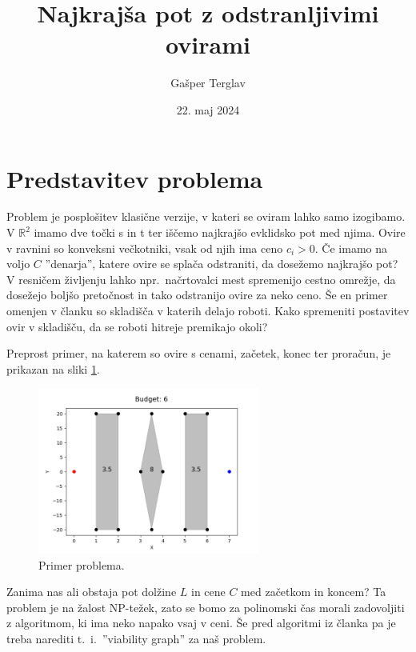 \documentclass{article}
\author{Gašper Terglav}
\date{22. maj 2024}
\title{Najkrajša pot z odstranljivimi ovirami}
\begin{document}
\maketitle


\section*{Predstavitev problema}

Problem je posplošitev klasične verzije, v kateri se oviram lahko samo izogibamo. V $\mathbb{R}^2$ imamo dve točki s in t ter iščemo najkrajšo evklidsko pot med njima. Ovire v ravnini so konveksni večkotniki, vsak od njih ima ceno $c_i > 0$. Če imamo na voljo $C$ ''denarja'', katere ovire se splača odstraniti, da dosežemo najkrajšo pot? V resničem življenju lahko npr.\ načrtovalci mest spremenijo cestno omrežje, da dosežejo boljšo pretočnost in tako odstranijo ovire za neko ceno. Še en primer omenjen v članku so skladišča v katerih delajo roboti. Kako spremeniti postavitev ovir v skladišču, da se roboti hitreje premikajo okoli? 

Preprost primer, na katerem so ovire s cenami, začetek, konec ter proračun, je prikazan na sliki \ref{fig:errPr1}.

\begin{figure}[h]
    \centering
    \includegraphics[width=0.65\textwidth]{err1.png}
    \caption{Primer problema.}
    \label{fig:errPr1}
\end{figure}


Zanima nas ali obstaja pot dolžine $L$ in cene $C$ med začetkom in koncem? Ta problem je na žalost NP-težek, zato se bomo za polinomski čas morali zadovoljiti z algoritmom, ki ima neko napako vsaj v ceni. Še pred algoritmi iz članka pa je treba narediti t.~i.\ ''viability graph'' za naš problem.



\end{document}
